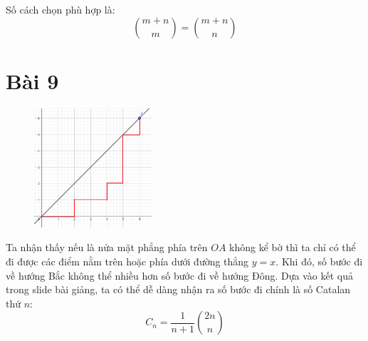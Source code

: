 \documentclass[main.tex]{subfiles}
\begin{document}
Số cách chọn phù hợp là:
$$
{m+n \choose m} = {m + n \choose n}
$$
\pagebreak
\section{Bài 9}
\begin{figure}
    \includegraphics[width=0.39\textwidth]{image/Bai9.png}
    \vspace*{-1cm}
\end{figure}
Ta nhận thấy nếu \s là nửa mặt phẳng phía trên $OA$ không kể bờ thì ta chỉ có thể đi được các điểm nằm trên hoặc phía dưới đường thẳng $y=x$.
Khi đó, số bước đi về hướng Bắc không thể nhiều hơn số bước đi về hướng Đông. Dựa vào kết quả trong slide bài giảng, ta có thể dễ dàng nhận ra số bước đi chính là số Catalan thứ $n$:
$$
C_n = \frac{1}{n+1}{2n\choose n}
$$
\end{document}
